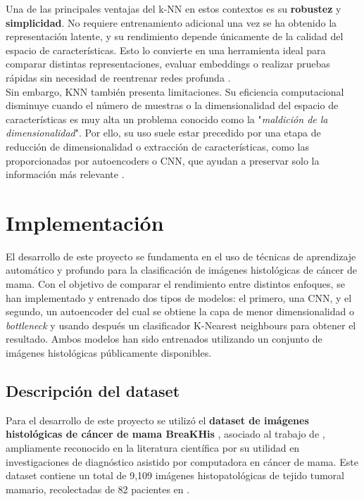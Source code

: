 \documentclass[12pt]{article} %
\begin{document}
Una de las principales ventajas del k-NN en estos contextos es su \textbf{robustez} y \textbf{simplicidad}. No requiere entrenamiento adicional una vez se ha obtenido la representación latente, y su rendimiento depende únicamente de la calidad del espacio de características. Esto lo convierte en una herramienta ideal para comparar distintas representaciones, evaluar embeddings o realizar pruebas rápidas sin necesidad de reentrenar redes profunda \cite{bengio2013representation}. \\

Sin embargo, KNN también presenta limitaciones. Su eficiencia computacional disminuye cuando el número de muestras o la dimensionalidad del espacio de características es muy alta un problema conocido como la "\textit{maldición de la dimensionalidad}". Por ello, su uso suele estar precedido por una etapa de reducción de dimensionalidad o extracción de características, como las proporcionadas por autoencoders o CNN, que ayudan a preservar solo la información más relevante \cite{aggarwal2014data}. \\

\newpage
\section{Implementación}
El desarrollo de este proyecto se fundamenta en el uso de técnicas de aprendizaje automático y profundo para la clasificación de imágenes histológicas de cáncer de mama. Con el objetivo de comparar el rendimiento entre distintos enfoques, se han implementado y entrenado dos tipos de modelos: el primero, una CNN, y el segundo, un autoencoder del cual se obtiene la capa de menor dimensionalidad o \textit{bottleneck} y usando después un clasificador K-Nearest neighbours para obtener el resultado. Ambos modelos han sido entrenados utilizando un conjunto de imágenes histológicas públicamente disponibles.\\

\subsection{Descripción del dataset}
Para el desarrollo de este proyecto se utilizó el \textbf{dataset de imágenes histológicas de cáncer de mama BreaKHis} \cite{google_drive_folder}, asociado al trabajo de \cite{bardou2018classification}, ampliamente reconocido en la literatura científica por su utilidad en investigaciones de diagnóstico asistido por computadora en cáncer de mama. Este dataset contiene un total de 9,109 imágenes histopatológicas de tejido tumoral mamario, recolectadas de 82 pacientes en \cite{spanhol2015dataset}.\\
\end{document}
